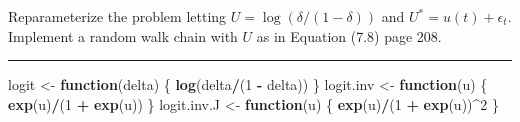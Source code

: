 \documentclass[
  11pt,
]{paper}
\newenvironment{Shaded}{\begin{snugshade}}{\end{snugshade}}
\newcommand{\ControlFlowTok}[1]{\textcolor[rgb]{0.13,0.29,0.53}{\textbf{#1}}}
\newcommand{\DecValTok}[1]{\textcolor[rgb]{0.00,0.00,0.81}{#1}}
\newcommand{\FunctionTok}[1]{\textcolor[rgb]{0.13,0.29,0.53}{\textbf{#1}}}
\newcommand{\NormalTok}[1]{#1}
\newcommand{\OtherTok}[1]{\textcolor[rgb]{0.56,0.35,0.01}{#1}}
\newcommand{\SpecialCharTok}[1]{\textcolor[rgb]{0.81,0.36,0.00}{\textbf{#1}}}
\begin{document}
Reparameterize the problem letting
\(U = \log\left(\delta/(1-\delta)\right)\) and
\(U^* = u(t) + \epsilon_t\). Implement a random walk chain with \(U\) as
in Equation (7.8) page 208.

\begin{center}\rule{0.5\linewidth}{0.5pt}\end{center}

\begin{Shaded}
\begin{Highlighting}[]
\NormalTok{logit }\OtherTok{\textless{}{-}} \ControlFlowTok{function}\NormalTok{(delta) \{}
    \FunctionTok{log}\NormalTok{(delta}\SpecialCharTok{/}\NormalTok{(}\DecValTok{1} \SpecialCharTok{{-}}\NormalTok{ delta))}
\NormalTok{\}}
\NormalTok{logit.inv }\OtherTok{\textless{}{-}} \ControlFlowTok{function}\NormalTok{(u) \{}
    \FunctionTok{exp}\NormalTok{(u)}\SpecialCharTok{/}\NormalTok{(}\DecValTok{1} \SpecialCharTok{+} \FunctionTok{exp}\NormalTok{(u))}
\NormalTok{\}}
\NormalTok{logit.inv.J }\OtherTok{\textless{}{-}} \ControlFlowTok{function}\NormalTok{(u) \{}
    \FunctionTok{exp}\NormalTok{(u)}\SpecialCharTok{/}\NormalTok{(}\DecValTok{1} \SpecialCharTok{+} \FunctionTok{exp}\NormalTok{(u))}\SpecialCharTok{\^{}}\DecValTok{2}
\NormalTok{\}}


\end{Highlighting}
\end{Shaded}
\end{document}

